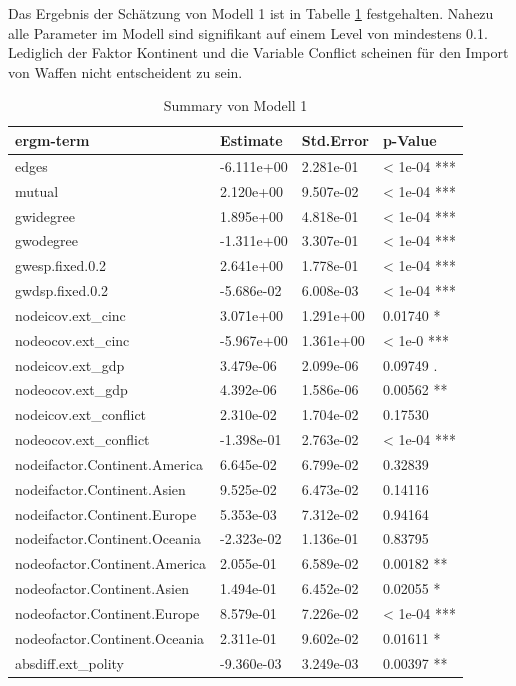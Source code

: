\documentclass[a4paper,ngerman,oneside,titlepage,bibliography=totoc,11pt]{scrreprt}
\begin{document}
Das Ergebnis der Schätzung von Modell 1 ist in Tabelle \ref{model1} festgehalten. Nahezu alle Parameter im Modell sind signifikant auf einem Level von mindestens 0.1. Lediglich der Faktor Kontinent und die Variable Conflict scheinen für den Import von Waffen nicht entscheident zu sein. 


\begin{table}[ht]
	\centering
	\caption{Summary von Modell 1 }
		\begin{tabular}{l|l|l|l}
		
		\hline
		ergm-term 						   				  & Estimate      & Std.Error   & p-Value 				\\
		\hline
    edges                     				& -6.111e+00  &2.281e-01      & < 1e-04 *** \\
    mutual                   					&  2.120e+00  &9.507e-02      & < 1e-04  ***\\
    gwidegree                  				&  1.895e+00  &4.818e-01      & < 1e-04  ***\\
    gwodegree                     		& -1.311e+00  &3.307e-01      & < 1e-04  ***\\
    gwesp.fixed.0.2                   &  2.641e+00  &1.778e-01      & < 1e-04  ***\\
    gwdsp.fixed.0.2				    				& -5.686e-02  &6.008e-03      & < 1e-04  ***\\
    nodeicov.ext\_cinc         				&  3.071e+00  &1.291e+00      & 0.01740  *\\
    nodeocov.ext\_cinc         				& -5.967e+00  &1.361e+00      & < 1e-0  ***\\
    nodeicov.ext\_gdp          				&  3.479e-06  &2.099e-06      & 0.09749  .\\
    nodeocov.ext\_gdp          				&  4.392e-06  &1.586e-06      & 0.00562  **\\
    nodeicov.ext\_conflict     				&  2.310e-02  &1.704e-02      & 0.17530  \\
    nodeocov.ext\_conflict     				& -1.398e-01  &2.763e-02      & < 1e-04  ***\\
    nodeifactor.Continent.America     &  6.645e-02  &6.799e-02      & 0.32839  \\
		nodeifactor.Continent.Asien     	&  9.525e-02  &6.473e-02      & 0.14116  \\
		nodeifactor.Continent.Europe     	&  5.353e-03  &7.312e-02      & 0.94164  \\
		nodeifactor.Continent.Oceania     & -2.323e-02  &1.136e-01      & 0.83795  \\
    nodeofactor.Continent.America     &  2.055e-01  &6.589e-02      & 0.00182  **\\
		nodeofactor.Continent.Asien     	&  1.494e-01  &6.452e-02      & 0.02055  *\\
		nodeofactor.Continent.Europe     	&  8.579e-01  &7.226e-02      & < 1e-04  ***\\
		nodeofactor.Continent.Oceania     &  2.311e-01  &9.602e-02      & 0.01611  *\\
		absdiff.ext\_polity            		& -9.360e-03  &3.249e-03      & 0.00397 **\\
		\hline
		\end{tabular}
		\label{model1}
\end{table}
\end{document}
